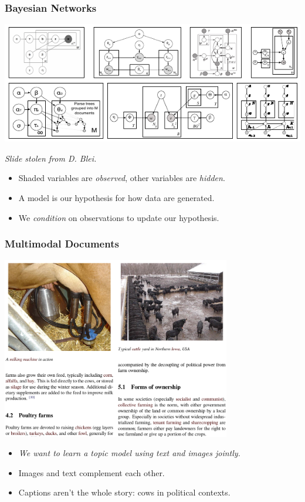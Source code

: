 \documentclass{beamer}
\begin{document}
\begin{frame}
  \frametitle{Bayesian Networks}
  {\centering \includegraphics[width=\textwidth]{assets/lda_crazy.pdf}}
  {\small \emph{Slide stolen from D. Blei.} \par}
  \begin{itemize}
  \item Shaded variables are \emph{observed}, other variables are \emph{hidden}.
  \item A model is our hypothesis for how data are generated.
  \item We \emph{condition} on observations to update our hypothesis.
  \end{itemize}
\end{frame}


\begin{frame}
  \frametitle{Multimodal Documents}
  \begin{center}
    \includegraphics[width=0.75\textwidth]{assets/wiki_farm.pdf}
  \end{center}
             
  \begin{itemize}
  \item \emph{We want to learn a topic model using text and images jointly.}
  \item Images and text complement each other.
  \item Captions aren't the whole story: cows in political contexts.
  \end{itemize}
             
\end{frame}
\end{document}
